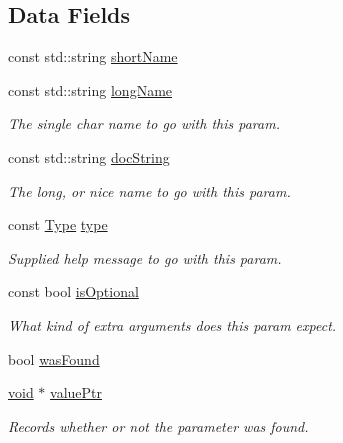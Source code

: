 \subsection*{Data Fields}
\begin{DoxyCompactItemize}
\item 
const std\+::string \hyperlink{structcli_1_1args_1_1_param_info__t_ade36ef841b81a36f9215c7d28a26843d}{short\+Name}
\item 
const std\+::string \hyperlink{structcli_1_1args_1_1_param_info__t_a277b5b2ccbf3c8d4cbcec08edfd0101e}{long\+Name}
\begin{DoxyCompactList}\small\item\em The single char name to go with this param. \end{DoxyCompactList}\item 
const std\+::string \hyperlink{structcli_1_1args_1_1_param_info__t_aafe8b201ba647e59ef10df5e57ce941e}{doc\+String}
\begin{DoxyCompactList}\small\item\em The long, or nice name to go with this param. \end{DoxyCompactList}\item 
const \hyperlink{structcli_1_1args_1_1_param_info__t_a7f4d580e3970c35519b05e538cfef71a}{Type} \hyperlink{structcli_1_1args_1_1_param_info__t_a38834b4fc7dee30a1a19a7be0dbea9ea}{type}
\begin{DoxyCompactList}\small\item\em Supplied help message to go with this param. \end{DoxyCompactList}\item 
const bool \hyperlink{structcli_1_1args_1_1_param_info__t_a9474010a248b831d9658a843e7c4f057}{is\+Optional}
\begin{DoxyCompactList}\small\item\em What kind of extra arguments does this param expect. \end{DoxyCompactList}\item 
bool \hyperlink{structcli_1_1args_1_1_param_info__t_a990cda95eccfe2275ff6814f032fd102}{was\+Found}
\item 
\hyperlink{_t_e_m_p_l_a_t_e__cdef_8h_ac9c84fa68bbad002983e35ce3663c686}{void} $\ast$ \hyperlink{structcli_1_1args_1_1_param_info__t_a655cf4f95a7cb652312c1ac7d4399b83}{value\+Ptr}
\begin{DoxyCompactList}\small\item\em Records whether or not the parameter was found. \end{DoxyCompactList}\item 

\end{DoxyCompactItemize}
